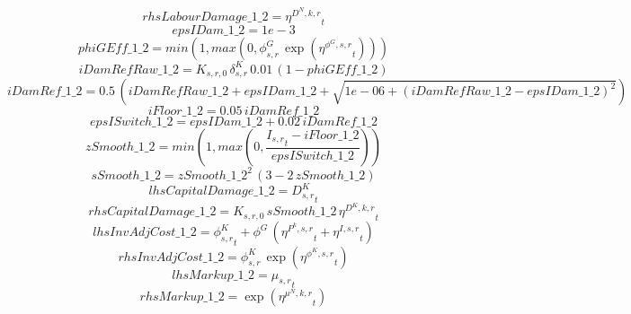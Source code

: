 \begin{dmath*}
rhsLabourDamage\_1\_2 = {{\eta^{D^{N},k,r}}}_{t}
\end{dmath*}
\begin{dmath*}
epsIDam\_1\_2 = 1e-3
\end{dmath*}
\begin{dmath*}
phiGEff\_1\_2 = min(1,max(0,{{\phi^{G}_{s,r}}}\, \exp\left({{\eta^{\phi^{G},s,r}}}_{t}\right)))
\end{dmath*}
\begin{dmath*}
iDamRefRaw\_1\_2 = {{K_{s,r,0}}}\, {{\delta^{K}_{s,r}}}\, 0.01\, \left(1-{phiGEff\_1\_2}\right)
\end{dmath*}
\begin{dmath*}
iDamRef\_1\_2 = 0.5\, \left({iDamRefRaw\_1\_2}+{epsIDam\_1\_2}+\sqrt{1e-06+\left({iDamRefRaw\_1\_2}-{epsIDam\_1\_2}\right)^{2}}\right)
\end{dmath*}
\begin{dmath*}
iFloor\_1\_2 = 0.05\, {iDamRef\_1\_2}
\end{dmath*}
\begin{dmath*}
epsISwitch\_1\_2 = {epsIDam\_1\_2}+0.02\, {iDamRef\_1\_2}
\end{dmath*}
\begin{dmath*}
zSmooth\_1\_2 = min(1,max(0,\frac{{{I_{s,r}}}_{t}-{iFloor\_1\_2}}{{epsISwitch\_1\_2}}))
\end{dmath*}
\begin{dmath*}
sSmooth\_1\_2 = {zSmooth\_1\_2}^{2}\, \left(3-2\, {zSmooth\_1\_2}\right)
\end{dmath*}
\begin{dmath*}
lhsCapitalDamage\_1\_2 = {{D^K_{s,r}}}_{t}
\end{dmath*}
\begin{dmath*}
rhsCapitalDamage\_1\_2 = {{K_{s,r,0}}}\, {sSmooth\_1\_2}\, {{\eta^{D^{K},k,r}}}_{t}
\end{dmath*}
\begin{dmath*}
lhsInvAdjCost\_1\_2 = {{\phi^K_{s,r}}}_{t}+{{\phi^{G}}}\, \left({{\eta^{P^k,s,r}}}_{t}+{{\eta^{I,s,r}}}_{t}\right)
\end{dmath*}
\begin{dmath*}
rhsInvAdjCost\_1\_2 = {{\phi^{K}_{s,r}}}\, \exp\left({{\eta^{\phi^{K},{s,r}}}}_{t}\right)
\end{dmath*}
\begin{dmath*}
lhsMarkup\_1\_2 = {{\mu_{s,r}}}_{t}
\end{dmath*}
\begin{dmath*}
rhsMarkup\_1\_2 = \exp\left({{\eta^{\mu^{N},k,r}}}_{t}\right)
\end{dmath*}
